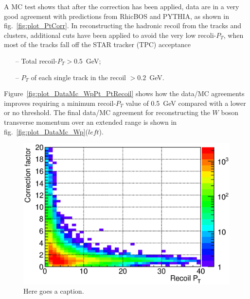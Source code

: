 \documentclass[12pt]{article}
\begin{document}
A MC test shows that after the correction has been applied, data are in a very good agreement with predictions from RhicBOS and PYTHIA, as shown in fig.~\ref{fig:plot_PtCorr}. In reconstructing the hadronic recoil from the tracks and clusters, additional cuts have been applied to avoid the very low recoli-$P_{T}$, when most of the tracks fall off the STAR tracker (TPC) acceptance 
\begin{itemize}
   \item[--] Total recoil-$P_{T} > 0.5$~GeV; 
    \item[--] $P_{T}$ of each single track in the recoil $> 0.2$~GeV. 
\end{itemize}
Figure~\ref{fig:plot_DataMc_WpPt_PtRecoil} shows how the data/MC agreements improves requiring a minimum recoil-$P_{T}$ value of 0.5~GeV compared with a lower or no threshold.
The final data/MC agreement for reconstructing the $W$ boson transverse momentum over an extended range is  shown in fig.~\ref{fig:plot_DataMc_Wp}($left$).


\begin{figure}[htbp]
\begin{center}
\includegraphics[scale=0.8]{images/plot_PtCorrFactor}
\end{center}
\caption{Here goes a caption.}
\label{fig:plot_PtCorrFactor} 
\end{figure}
\end{document}
